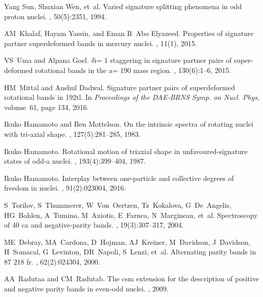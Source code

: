 \documentclass[11pt]{article}
\begin{document}
\begin{thebibliography}{99}
Yang Sun, Shuxian Wen, et~al.
\newblock Varied signature splitting phenomena in odd proton nuclei.
, 50(5):2351, 1994.

AM~Khalaf, Hayam Yassin, and Eman R~Abo Elyazeed.
\newblock Properties of signature partner superdeformed bands in mercury
  nuclei.
, 11(1), 2015.

VS~Uma and Alpana Goel.
\newblock $\delta$i= 1 staggering in signature partner pairs of super-deformed
  rotational bands in the a= 190 mass region.
, 130(6):1--6, 2015.

HM~Mittal and Anshul Dadwal.
\newblock Signature partner pairs of superdeformed rotational bands in 192tl.
\newblock In {\em Proceedings of the DAE-BRNS Symp. on Nucl. Phys}, volume~61,
  page 134, 2016.

Ikuko Hamamoto and Ben Mottelson.
\newblock On the intrinsic spectra of rotating nuclei with tri-axial shape.
, 127(5):281--285, 1983.

Ikuko Hamamoto.
\newblock Rotational motion of triaxial shape in unfavoured-signature states of
  odd-a nuclei.
, 193(4):399--404, 1987.

Ikuko Hamamoto.
\newblock Interplay between one-particle and collective degrees of freedom in
  nuclei.
, 91(2):023004, 2016.

S~Torilov, S~Thummerer, W~Von~Oertzen, Tz~Kokalova, G~De~Angelis, HG~Bohlen,
  A~Tumino, M~Axiotis, E~Farnea, N~Marginean, et~al.
\newblock Spectroscopy of 40 ca and negative-parity bands.
,
  19(3):307--317, 2004.

ME~Debray, MA~Cardona, D~Hojman, AJ~Kreiner, M~Davidson, J~Davidson, H~Somacal,
  G~Levinton, DR~Napoli, S~Lenzi, et~al.
\newblock Alternating parity bands in 87 218 fr.
, 62(2):024304, 2000.

AA~Radutaa and CM~Radutab.
\newblock The csm extension for the description of positive and negative parity
  bands in even-odd nuclei.
, 2009.


\end{thebibliography}
\end{document}
